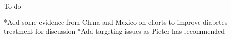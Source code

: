 To do

*Add some evidence from China and Mexico on efforts to improve diabetes treatment for discussion
*Add targeting issues as Pieter has recommended 
